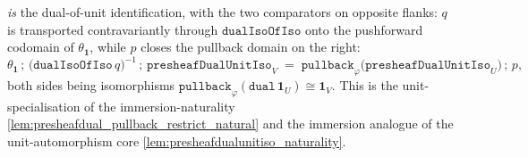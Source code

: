 \begin{lemma}
  \emph{is} the dual-of-unit identification, with the two comparators on opposite flanks: \(q\) is
  transported contravariantly through \(\mathtt{dualIsoOfIso}\) onto the pushforward codomain of
  \(\theta_{\mathbf 1}\), while \(p\) closes the pullback domain on the right:
  \[
    \theta_{\mathbf 1}
      \,\mathbin{;}\, \bigl(\mathtt{dualIsoOfIso}\,q\bigr)^{-1}
      \,\mathbin{;}\, \mathtt{presheafDualUnitIso}_V
    \;=\; \mathtt{pullback}_\varphi\bigl(\mathtt{presheafDualUnitIso}_U\bigr)
      \,\mathbin{;}\, p,
  \]
  both sides being isomorphisms
  \(\mathtt{pullback}_\varphi(\mathtt{dual}\,\mathbf 1_U) \cong \mathbf 1_V\). This is the
  unit-specialisation of the immersion-naturality \cref{lem:presheafdual_pullback_restrict_natural}
  and the immersion analogue of the unit-automorphism core
  \cref{lem:presheafdualunitiso_naturality}.
\end{lemma}
